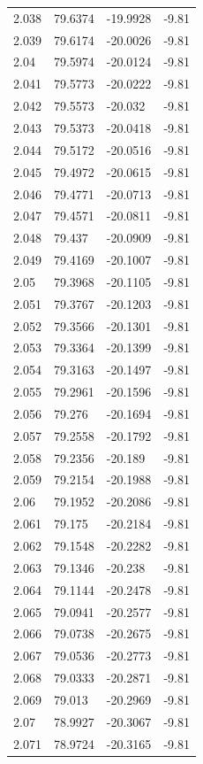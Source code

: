 \begin{tabular}{llll}
2.038 & 79.6374 & -19.9928 & -9.81 \\
2.039 & 79.6174 & -20.0026 & -9.81 \\
2.04 & 79.5974 & -20.0124 & -9.81 \\
2.041 & 79.5773 & -20.0222 & -9.81 \\
2.042 & 79.5573 & -20.032 & -9.81 \\
2.043 & 79.5373 & -20.0418 & -9.81 \\
2.044 & 79.5172 & -20.0516 & -9.81 \\
2.045 & 79.4972 & -20.0615 & -9.81 \\
2.046 & 79.4771 & -20.0713 & -9.81 \\
2.047 & 79.4571 & -20.0811 & -9.81 \\
2.048 & 79.437 & -20.0909 & -9.81 \\
2.049 & 79.4169 & -20.1007 & -9.81 \\
2.05 & 79.3968 & -20.1105 & -9.81 \\
2.051 & 79.3767 & -20.1203 & -9.81 \\
2.052 & 79.3566 & -20.1301 & -9.81 \\
2.053 & 79.3364 & -20.1399 & -9.81 \\
2.054 & 79.3163 & -20.1497 & -9.81 \\
2.055 & 79.2961 & -20.1596 & -9.81 \\
2.056 & 79.276 & -20.1694 & -9.81 \\
2.057 & 79.2558 & -20.1792 & -9.81 \\
2.058 & 79.2356 & -20.189 & -9.81 \\
2.059 & 79.2154 & -20.1988 & -9.81 \\
2.06 & 79.1952 & -20.2086 & -9.81 \\
2.061 & 79.175 & -20.2184 & -9.81 \\
2.062 & 79.1548 & -20.2282 & -9.81 \\
2.063 & 79.1346 & -20.238 & -9.81 \\
2.064 & 79.1144 & -20.2478 & -9.81 \\
2.065 & 79.0941 & -20.2577 & -9.81 \\
2.066 & 79.0738 & -20.2675 & -9.81 \\
2.067 & 79.0536 & -20.2773 & -9.81 \\
2.068 & 79.0333 & -20.2871 & -9.81 \\
2.069 & 79.013 & -20.2969 & -9.81 \\
2.07 & 78.9927 & -20.3067 & -9.81 \\
2.071 & 78.9724 & -20.3165 & -9.81 \\

\end{tabular}

